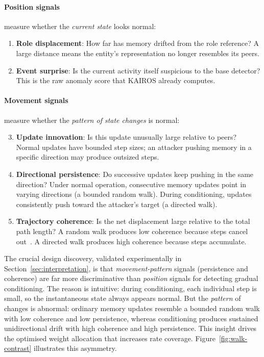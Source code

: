 \documentclass[10pt,twocolumn]{article}
\begin{document}
\paragraph{Position signals} measure whether the \emph{current state} looks
normal:
\begin{enumerate}
  \item \textbf{Role displacement}: How far has memory drifted
    from the role reference?  A large distance means the entity's
    representation no longer resembles its peers.
  \item \textbf{Event surprise}: Is the current activity itself
    suspicious to the base detector?  This is the raw anomaly score
    that KAIROS already computes.
\end{enumerate}

\paragraph{Movement signals} measure whether the \emph{pattern of state
changes} is normal:
\begin{enumerate}\setcounter{enumi}{2}
  \item \textbf{Update innovation}: Is this update unusually large
    relative to peers?  Normal updates have bounded step sizes; an
    attacker pushing memory in a specific direction may produce
    outsized steps.
  \item \textbf{Directional persistence}: Do successive updates keep
    pushing in the same direction?  Under normal operation, consecutive
    memory updates point in varying directions (a bounded random walk).
    During conditioning, updates consistently push toward the attacker's
    target (a directed walk).
  \item \textbf{Trajectory coherence}: Is the net displacement large
    relative to the total path length?  A random walk produces low
    coherence because steps cancel out~\cite{benhamou2004straightness}.
    A directed walk produces high
    coherence because steps accumulate.
\end{enumerate}

The crucial design discovery, validated experimentally in
Section~\ref{sec:interpretation}, is that \emph{movement-pattern} signals
(persistence and coherence) are far more discriminative than
\emph{position} signals for detecting gradual conditioning.  The reason is
intuitive: during conditioning, each individual step is small, so the
instantaneous state always appears normal.  But the \emph{pattern} of
changes is abnormal: ordinary memory updates resemble a bounded random
walk with low coherence and low persistence, whereas conditioning produces
sustained unidirectional drift with high coherence and high persistence.
This insight drives the optimised weight allocation that increases rate
coverage.  Figure~\ref{fig:walk-contrast} illustrates this asymmetry.
\end{document}

